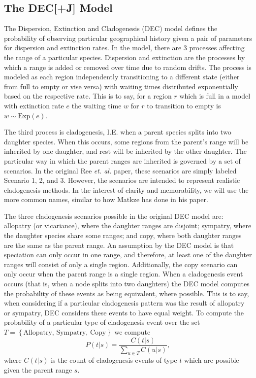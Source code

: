 \documentclass{article}
\begin{document}
\subsection{The DEC[+J] Model} \label{sec:model}

The Dispersion, Extinction and Cladogenesis (DEC) model defines the probability
of observing particular geographical history given a pair of parameters for
dispersion and extinction rates.
In the model, there are 3 processes affecting the range of a particular
species.
Dispersion and extinction are the processes by which a range is added or
removed over time due to random drifts.
The process is modeled as each region independently transitioning to a
different state (either from full to empty or vise versa) with waiting times
distributed exponentially based on the respective rate.
This is to say, for a region \( r \) which is full in a model with extinction
rate \( e \) the waiting time \( w \) for \( r \) to transition to empty is \(
w \sim \text{Exp}(e) \).

The third process is cladogenesis, I.E. when a parent species splits into two
daughter species.
When this occurs, some regions from the parent's range will be inherited by one
daughter, and rest will be inherited by the other daughter.
The particular way in which the parent ranges are inherited is governed by a
set of scenarios.
In the original Ree \textit{et. al.}\cite{ALikelihoodFrReeR2005} paper, these
scenarios are simply labeled Scenario 1, 2, and 3.
However, the scenarios are intended to represent realistic cladogenesis
methods.
In the interest of clarity and memorability, we will use the more common names,
similar to how Matkze \cite{ModelSelectionMatzke2014} has done in his paper.

The three cladogenesis scenarios possible in the original DEC model are:
allopatry (or vicariance), where the daughter ranges are disjoint; sympatry,
where the daughter species share some ranges; and copy, where both daughter
ranges are the same as the parent range.
An assumption by the DEC model is that speciation can only occur in one range,
and therefore, at least one of the daughter ranges will consist of only a
single region.
Additionally, the copy scenario can only occur when the parent range is a
single region.
When a cladogenesis event occurs (that is, when a node splits into two
daughters) the DEC model computes the probability of these events as being
equivalent, where possible.
This is to say, when considering if a particular cladogenesis pattern was the
result of allopatry or sympatry, DEC considers these events to have equal
weight.
To compute the probability of a particular type of cladogenesis event over the
set \(T = \left\{\text{Allopatry, Sympatry, Copy}\right\}\) we compute
\[
	P(t |
	s) = \frac{C(t | s)}{\sum_{u \in T} C(u | s)},
\]
where \( C(t|s) \) is the
count of cladogenesis events of type $ t $ which are possible given the parent
range \( s \).
\end{document}
